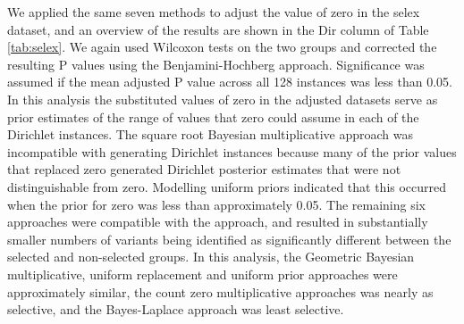 \documentclass[article]{ajs}\usepackage[]{graphicx}\usepackage[]{color}
\begin{document}
We applied the same seven methods to adjust the value of zero in the selex dataset, and an overview of the results are shown in the Dir column of Table \ref{tab:selex}. We again used Wilcoxon tests on the two groups and corrected the resulting P values using the Benjamini-Hochberg approach. Significance was assumed if the mean adjusted P value across all 128 instances was less than 0.05.  In this analysis the substituted values of zero in the adjusted datasets serve as prior estimates of the range of values that zero could assume in each of the Dirichlet instances.  The square root Bayesian multiplicative approach was incompatible with generating Dirichlet instances because many of the prior values that replaced zero generated Dirichlet posterior estimates that were not distinguishable from zero. Modelling uniform priors indicated that this occurred when the prior for zero was less than approximately 0.05. The remaining six approaches were compatible with the approach, and resulted in substantially smaller numbers of variants being identified as significantly different between the selected and non-selected groups. In this analysis, the Geometric Bayesian multiplicative, uniform replacement and uniform prior approaches were approximately similar, the count zero multiplicative  approaches was nearly as selective, and the Bayes-Laplace approach was least selective. 
\end{document}
